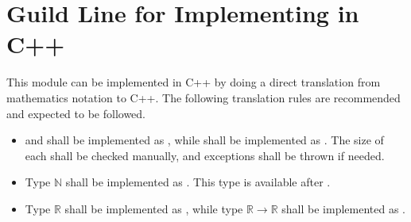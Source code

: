 \documentclass[12pt, titlepage]{article}
\begin{document}
\section{Guild Line for Implementing in C++}\label{Appendix:guildeline}
This module can be implemented in C++ by doing a direct translation from mathematics notation to C++.
The following translation rules are recommended and expected to be followed.
\begin{itemize}
	\item {} and  shall be implemented as , while  shall be implemented as . The size of each  shall be checked manually, and exceptions shall be thrown if needed.
	\item Type $\mathbb{N}$ shall be implemented as . This type is available after . 
	\item Type $\mathbb{R}$ shall be implemented as , while type $\mathbb{R}\rightarrow\mathbb{R}$ shall be implemented as . 
\end{itemize}
\end{document}
